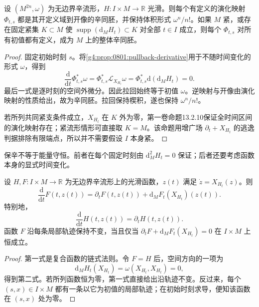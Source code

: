 \begin{proposition}\label{g4:prop:0901:symplectic-flow}
	设 \((M^{2n},\omega)\) 为无边界辛流形，\(H:I\times M\to\mathbb R\) 光滑。则每个有定义的演化映射 \(\Phi_{t,s}\) 都是其开定义域到开像的辛同胚，并保持体积形式 \(\omega^n/n!\)。如果 \(M\) 紧，或存在固定紧集 \(K\subset M\) 使 \(\operatorname{supp}(\mathrm{d}_M H_t)\subset K\) 对全部 \(t\in I\) 成立，则每个 \(\Phi_{t,s}\) 对所有初值都有定义，成为 \(M\) 上的整体辛同胚。
\end{proposition}
\begin{proof}
	固定初始时刻 \(s\)。将\cref{g4:prop:0801:pullback-derivative}用于不随时间变化的形式 \(\omega\)，得到
	\[
		\frac{\mathrm{d}}{\mathrm{d}t}\Phi_{t,s}^*\omega
		=\Phi_{t,s}^*\mathcal L_{X_{H_t}}\omega
		=\Phi_{t,s}^*\mathrm{d}(\mathrm{d}_M H_t)=0.
	\]
	最后一式是逐时刻的空间外微分。因此拉回始终等于初值 \(\omega\)。逆映射与开像由演化映射的性质给出，故为辛同胚。拉回保持楔积，遂也保持 \(\omega^n/n!\)。

	若所列共同紧支条件成立，\(X_{H_t}\) 在 \(K\) 外为零，第一卷命题13.2.10保证全时间区间的演化映射存在；紧流形情形可直接取 \(K=M\)。该命题用增广场 \(\partial_t+X_{H_t}\) 的逃逸判据排除有限端点，所以并不需要假设 \(I\) 本身紧。
\end{proof}

保辛不等于能量守恒。前者在每个固定时刻由 \(\mathrm{d}_M^2H_t=0\) 保证；后者还要考虑函数本身的显式时间变化。

\begin{proposition}\label{g4:prop:0901:energy-evolution}
	设 \(H,F:I\times M\to\mathbb R\) 为无边界辛流形上的光滑函数，\(z(t)\) 满足 \(\dot z=X_{H_t}(z)\)。则
	\begin{equation}\label{g4:eq:0901:observable-evolution}
		\frac{\mathrm{d}}{\mathrm{d}t}F(t,z(t))
		=\partial_tF(t,z(t))+\mathrm{d}_M F_t(X_{H_t})(z(t)).
	\end{equation}
	特别地，
	\begin{equation}\label{g4:eq:0901:energy-evolution}
		\frac{\mathrm{d}}{\mathrm{d}t}H(t,z(t))=\partial_tH(t,z(t)).
	\end{equation}
	函数 \(F\) 沿每条局部轨迹保持不变，当且仅当 \(\partial_tF+\mathrm{d}_M F_t(X_{H_t})=0\) 在 \(I\times M\) 上恒成立。
\end{proposition}
\begin{proof}
	第一式是复合函数的链式法则。令 \(F=H\) 后，空间方向的一项为
	\[
		\mathrm{d}_M H_t(X_{H_t})=\omega(X_{H_t},X_{H_t})=0,
	\]
	得到第二式。若所列函数恒为零，第一式直接给出沿轨迹不变。反过来，每个 \((s,x)\in I\times M\) 都有一条以它为初值的局部轨迹；在初始时刻求导，便知该函数在 \((s,x)\) 处为零。
\end{proof}

